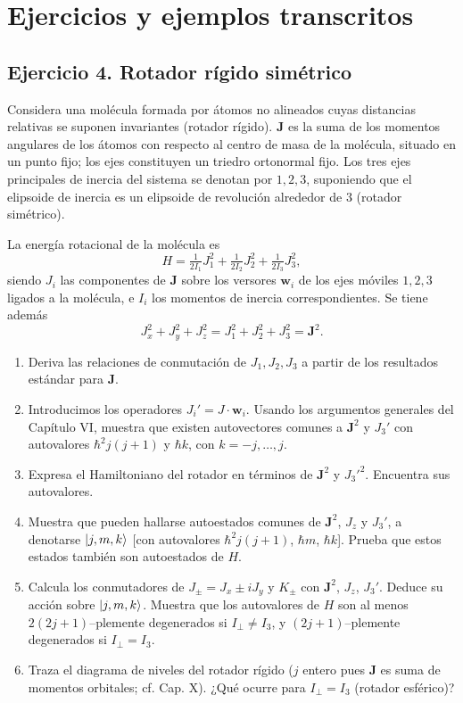 \documentclass[a4paper,11pt]{article}
\begin{document}
\section*{Ejercicios y ejemplos transcritos}

\subsection*{Ejercicio 4. Rotador rígido simétrico}
Considera una molécula formada por átomos no alineados cuyas distancias relativas se suponen invariantes (rotador rígido). \(\mathbf{J}\) es la suma de los momentos angulares de los átomos con respecto al centro de masa de la molécula, situado en un punto fijo; los ejes constituyen un triedro ortonormal fijo. Los tres ejes principales de inercia del sistema se denotan por $1,2,3$, suponiendo que el elipsoide de inercia es un elipsoide de revolución alrededor de $3$ (rotador simétrico).

La energía rotacional de la molécula es
\[
H=\tfrac{1}{2I_1}J_1^2+\tfrac{1}{2I_2}J_2^2+\tfrac{1}{2I_3}J_3^2,
\]
siendo $J_i$ las componentes de \(\mathbf{J}\) sobre los versores $\mathbf{w}_i$ de los ejes móviles $1,2,3$ ligados a la molécula, e $I_i$ los momentos de inercia correspondientes. Se tiene además
\[
J_x^2+J_y^2+J_z^2=J_1^2+J_2^2+J_3^2=\mathbf{J}^2.
\]

\begin{enumerate}
	\item Deriva las relaciones de conmutación de $J_1,J_2,J_3$ a partir de los resultados estándar para \(\mathbf{J}\).
	\item Introducimos los operadores $J_i'=J\cdot \mathbf{w}_i$. Usando los argumentos generales del Capítulo VI, muestra que existen autovectores comunes a $\mathbf{J}^2$ y $J_3'$ con autovalores $\hbar^2j(j+1)$ y $\hbar k$, con $k=-j,\dots,j$.
	\item Expresa el Hamiltoniano del rotador en términos de $\mathbf{J}^2$ y $J_3'^2$. Encuentra sus autovalores.
	\item Muestra que pueden hallarse autoestados comunes de $\mathbf{J}^2$, $J_z$ y $J_3'$, a denotarse $\ket{j,m,k}$ [con autovalores $\hbar^2j(j+1)$, $\hbar m$, $\hbar k$]. Prueba que estos estados también son autoestados de $H$.
	\item Calcula los conmutadores de $J_\pm=J_x\pm iJ_y$ y $K_\pm$ con $\mathbf{J}^2$, $J_z$, $J_3'$. Deduce su acción sobre $\ket{j,m,k}$. Muestra que los autovalores de $H$ son al menos $2(2j+1)$–plemente degenerados si $I_\perp\ne I_3$, y $(2j+1)$–plemente degenerados si $I_\perp=I_3$.
	\item Traza el diagrama de niveles del rotador rígido ($j$ entero pues \(\mathbf{J}\) es suma de momentos orbitales; cf. Cap. X). ¿Qué ocurre para $I_\perp=I_3$ (rotador esférico)?
\end{enumerate}
\end{document}
